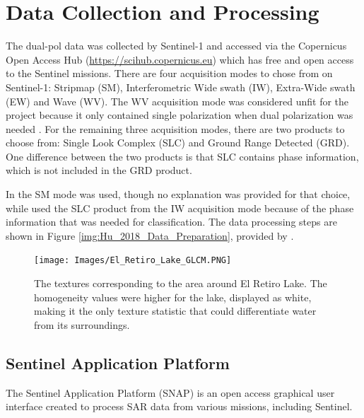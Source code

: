 \documentclass[conference]{IEEEtran}
\begin{document}
	\section{Data Collection and Processing}
	The dual-pol data was collected by Sentinel-1 and accessed via the Copernicus Open Access Hub (\url{https://scihub.copernicus.eu}) which has free and open access to the Sentinel missions.
	There are four acquisition modes to chose from on Sentinel-1: Stripmap (SM), Interferometric Wide swath (IW), Extra-Wide swath (EW) and Wave (WV).
	The WV acquisition mode was considered unfit for the project because it only contained single polarization when dual polarization was needed \cite{acq_modes}.
	For the remaining three acquisition modes, there are two products to choose from: Single Look Complex (SLC) and Ground Range Detected (GRD).
	One difference between the two products is that SLC contains phase information, which is not included in the GRD product.
	
	In \cite{Wurm_2017} the SM mode was used, though no explanation was provided for that choice, while \cite{Hu_2018} used the SLC product from the IW acquisition mode because of the phase information that was needed for classification. 
	The data processing steps are shown in Figure \ref{img:Hu_2018_Data_Preparation}, provided by \cite{Hu_2018}.
	
	\begin{figure}[htbp]
		\centerline{\texttt{[image: Images/El\_Retiro\_Lake\_GLCM.PNG]}}
		\caption{The textures corresponding to the area around El Retiro Lake.
			The homogeneity values were higher for the lake, displayed as white, making it the only texture statistic that could differentiate water from its surroundings.}
		\label{img:El_Retiro_GLCM}
	\end{figure}

	
	\subsection{Sentinel Application Platform}
	The Sentinel Application Platform (SNAP) is an open access graphical user interface created to process SAR data from various missions, including Sentinel.
\end{document}
